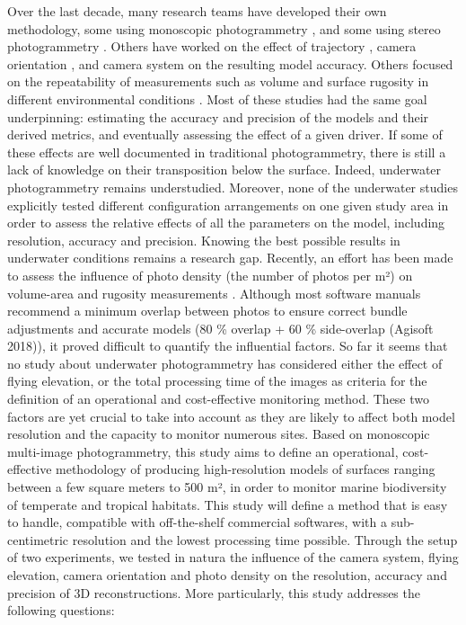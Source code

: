 Over the last decade, many research teams have developed their own methodology, some using monoscopic photogrammetry \citep{figueira_accuracy_2015, gutierrez-heredia_simple_2015, burns_integrating_2015,burns_utilizing_2015, burns_assessing_2016}, and some using stereo photogrammetry \citep{abdo_efficiently_2006, bryson_characterization_2017, pizarro_simple_2017, ferrari_quantifying_2016}. Others have worked on the effect of trajectory \citep{pizarro_simple_2017}, camera orientation \citep{chiabrando_influence_2017, raczynski_accuracy_2017}, and camera system \citep{guo_accuracy_2016} on the resulting model accuracy. Others focused on the repeatability of measurements such as volume \citep{lavy_quick_2015} and surface rugosity in different environmental conditions \citep{bryson_characterization_2017}. Most of these studies had the same goal underpinning: estimating the accuracy and precision of the models and their derived metrics, and eventually assessing the effect of a given driver. If some of these effects are well documented in traditional photogrammetry, there is still a lack of knowledge on their transposition below the surface. Indeed, underwater photogrammetry remains understudied. Moreover, none of the underwater studies explicitly tested different configuration arrangements on one given study area in order to assess the relative effects of all the parameters on the model, including resolution, accuracy and precision. Knowing the best possible results in underwater conditions remains a research gap. Recently, an effort has been made to assess the influence of photo density (the number of photos per m²) on volume-area \citep{raoult_how_2017} and rugosity measurements \citep{bryson_characterization_2017}. Although most software manuals recommend a minimum overlap between photos to ensure correct bundle adjustments and accurate models (80 \% overlap + 60 \% side-overlap (Agisoft 2018)), it proved difficult to quantify the influential factors. So far it seems that no study about underwater photogrammetry has considered either the effect of flying elevation, or the total processing time of the images as criteria for the definition of an operational and cost-effective monitoring method. These two factors are yet crucial to take into account as they are likely to affect both model resolution and the capacity to monitor numerous sites.
Based on monoscopic multi-image photogrammetry, this study aims to define an operational, cost-effective methodology of producing high-resolution models of surfaces ranging between a few square meters to 500 m², in order to monitor marine biodiversity of temperate and tropical habitats. This study will define a method that is easy to handle, compatible with off-the-shelf commercial softwares, with a sub-centimetric resolution and the lowest processing time possible. Through the setup of two experiments, we tested in natura the influence of the camera system, flying elevation, camera orientation and photo density on the resolution, accuracy and precision of 3D reconstructions. More particularly, this study addresses the following questions:

